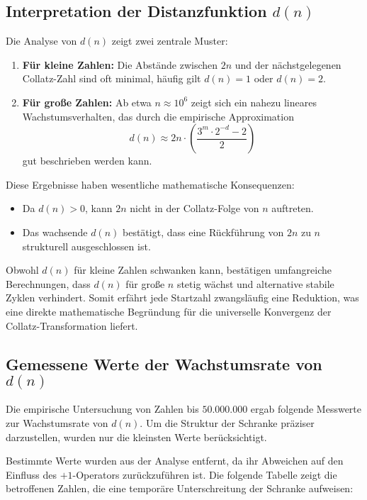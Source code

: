 \documentclass[a4paper,12pt]{article}
\begin{document}
\subsection{Interpretation der Distanzfunktion \( d(n) \)}

Die Analyse von \( d(n) \) zeigt zwei zentrale Muster:

\begin{enumerate}
    \item \textbf{Für kleine Zahlen:} Die Abstände zwischen \( 2n \) und der nächstgelegenen Collatz-Zahl sind oft minimal, häufig gilt \( d(n) = 1 \) oder \( d(n) = 2 \).
    \item \textbf{Für große Zahlen:} Ab etwa \( n \approx 10^6 \) zeigt sich ein nahezu lineares Wachstumsverhalten, das durch die empirische Approximation 
    \[
    d(n) \approx 2n \cdot \left( \frac{3^m \cdot 2^{-d} - 2}{2} \right)
    \]
    gut beschrieben werden kann.
\end{enumerate}

Diese Ergebnisse haben wesentliche mathematische Konsequenzen:
\begin{itemize}
    \item Da \( d(n) > 0 \), kann \( 2n \) nicht in der Collatz-Folge von \( n \) auftreten.
    \item Das wachsende \( d(n) \) bestätigt, dass eine Rückführung von \( 2n \) zu \( n \) strukturell ausgeschlossen ist.
\end{itemize}

Obwohl \( d(n) \) für kleine Zahlen schwanken kann, bestätigen umfangreiche Berechnungen, dass \( d(n) \) für große \( n \) stetig wächst und alternative stabile Zyklen verhindert. Somit erfährt jede Startzahl zwangsläufig eine Reduktion, was eine direkte mathematische Begründung für die universelle Konvergenz der Collatz-Transformation liefert.




\subsection{Gemessene Werte der Wachstumsrate von \( d(n) \)}

Die empirische Untersuchung von Zahlen bis \( 50.000.000 \) ergab folgende Messwerte zur Wachstumsrate von \( d(n) \). Um die Struktur der Schranke präziser darzustellen, wurden nur die kleinsten Werte berücksichtigt.

Bestimmte Werte wurden aus der Analyse entfernt, da ihr Abweichen auf den Einfluss des \(+1\)-Operators zurückzuführen ist. Die folgende Tabelle zeigt die betroffenen Zahlen, die eine temporäre Unterschreitung der Schranke aufweisen:
\end{document}

